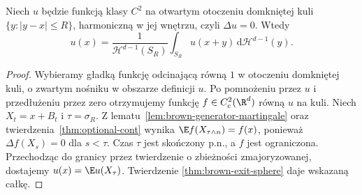 \begin{wniosek}
Niech $u$ będzie funkcją klasy $C^2$ na otwartym
otoczeniu domkniętej kuli $\{y:|y-x|\le R\}$,
harmoniczną w jej wnętrzu, czyli $\Delta u=0$.
Wtedy
\[
u(x)=
\frac{1}{\mathcal H^{d-1}(S_R)}
\int_{S_R}u(x+y)\,\mathrm d\mathcal H^{d-1}(y).
\]
\end{wniosek}
\begin{proof}
Wybieramy gładką funkcję odcinającą równą $1$
w otoczeniu domkniętej kuli, o zwartym nośniku
w obszarze definicji $u$. Po pomnożeniu przez $u$
i przedłużeniu przez zero otrzymujemy funkcję
$f\in C_c^2(\R^d)$ równą $u$ na kuli.
Niech $X_t=x+B_t$ i $\tau=\sigma_R$.
Z lematu~\ref{lem:brown-generator-martingale}
oraz twierdzenia~\ref{thm:optional-cont} wynika
$\E f(X_{\tau\wedge n})=f(x)$, ponieważ
$\Delta f(X_s)=0$ dla $s<\tau$.
Czas $\tau$ jest skończony p.n., a $f$ jest ograniczona.
Przechodząc do granicy przez twierdzenie
o zbieżności zmajoryzowanej, dostajemy
$u(x)=\E u(X_\tau)$. Twierdzenie
\ref{thm:brown-exit-sphere} daje wskazaną całkę.
\end{proof}

